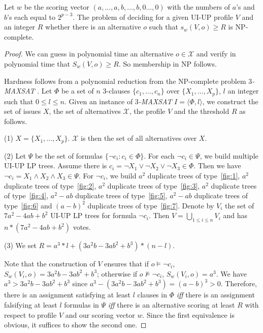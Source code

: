 \begin{thm}
	Let $w$ be the scoring vector $(a,\ldots,a, b,\ldots,b, 0\ldots,0)$ with the numbers of 
	$a$'s and $b$'s each equal to $2^{p-3}$.  The problem of deciding for a given UI-UP profile 
	$V$ and an integer $R$ whether there is an alternative
	$o$ such that $s_w(V,o) \geq R$ is NP-complete.
\end{thm}
\begin{proof}
  We can guess in polynomial time an alternative $o \in \mathcal{X}$ and 
  verify in polynomial time that $S_w(V, o) \geq R$.  So membership in NP follows.

  Hardness follows from a polynomial reduction from the NP-complete 
  problem 3\textit{-MAXSAT} \cite{Papadimitriou:1988}.
  Let $\Phi$ be a set of $n$ 3-clauses $\{ c_1,\ldots,c_n \}$ over $\{ X_1,\ldots,X_p \}$, 
  $l$ an integer such that $0 \leq l \leq n$.
  Given an instance of 3\textit{-MAXSAT} $I=\langle \Phi, l \rangle$, we construct the set of issues 
  $X$, the set of alternatives $\mathcal{X}$, the profile $V$ and the threshold $R$ as follows.

  (1) $X = \{ X_1,\ldots,X_p \}$.  $\mathcal{X}$ is then the set of 
      all alternatives over $X$.

  (2) Let $\Psi$ be the set of formulas $\{ \neg c_i:c_i \in \Phi \}$.  For each 
      $\neg c_i \in \Psi$, we build multiple UI-UP LP trees.  Assume there is $c_i = 
      \neg X_1 \vee \neg X_2 \vee \neg X_3 \in \Phi$. Then we have $\neg c_i = X_1 \wedge 
      X_2 \wedge X_3 \in \Psi$.  For $\neg c_i$, we build $a^2$ duplicate trees of 
      type~\ref{fig:1}, $a^2$ duplicate trees of type~\ref{fig:2}, $a^2$ duplicate 
      trees of type~\ref{fig:3}, $a^2$ duplicate trees of type~\ref{fig:4}, 
      $a^2-ab$ duplicate trees of type~\ref{fig:5}, 
      $a^2-ab$ duplicate trees of type~\ref{fig:6} and 
      $(a-b)^2$ duplicate trees of type~\ref{fig:7}. 
      Denote by $V_i$ the set of $7a^2-4ab+b^2$ UI-UP LP trees for formula 
      $\neg c_i$.  Then $V = \bigcup_{1 \leq i \leq n} V_i$ and has 
      $n*(7a^2-4ab+b^2)$ votes.

  (3) We set $R = a^3*l+(3a^2b-3ab^2+b^3)*(n-l)$.

  Note that the construction of $V$ ensures that if $o \models \neg c_i$, $S_w(V_i, o)=
  3a^2b-3ab^2+b^3$; 
  otherwise if $o \not \models \neg c_i$, $S_w(V_i, o)=a^3$.  
  We have $a^3 > 3a^2b-3ab^2+b^3$ since 
  $a^3-(3a^2b-3ab^2+b^3)=(a-b)^3 > 0$.
  Therefore, there is an assignment 
  satisfying at least $l$ clauses in $\Phi$ \textit{iff} there is an assignment falsifying 
  at least $l$ formulas in $\Psi$ \textit{iff} there is an alternative scoring at least 
  $R$ with respect to profile $V$ and our scoring vector $w$.
	Since the first equivalence is obvious, it suffices to show the second one.


\end{proof}
